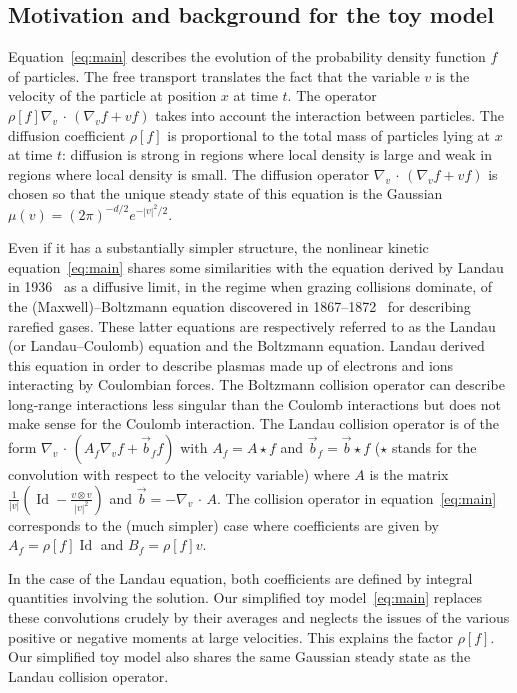 \documentclass[AHL,Unicode,longabstracts,published]{cedram}
\DeclareMathOperator{\Id}{Id}
\begin{document}
\subsection{Motivation and background for the toy model}

Equation~\eqref{eq:main} describes the evolution of the probability density function $f$ of particles. The free transport translates the fact that the variable $v$ is the velocity of the particle at position $x$ at time $t$. The operator $\rho [f] \nabla_v\,\cdot\,(\nabla_v f + vf)$ takes into account the interaction between particles. The diffusion coefficient $\rho [f]$ is proportional to the total mass of particles lying at $x$ at time $t$: diffusion is strong in regions where local density is large and weak in regions where local density is small. The diffusion operator $\nabla_v\,\cdot\,(\nabla_v f + vf)$ is chosen so that the unique steady state of this equation is the Gaussian $\mu(v) = (2\pi)^{-d/2} e^{-|v|^2/2}$.

Even if it has a substantially simpler structure, the nonlinear kinetic equation~\eqref{eq:main} shares some similarities with the equation derived by Landau in 1936~\cite{landau1936} as a diffusive limit, in the regime when grazing collisions dominate, of the (Maxwell)--Boltzmann equation discovered in 1867--1872~\cite{boltzmann1872weitere,clerk1867dynamical} for describing rarefied gases. These latter equations are respectively referred to as the Landau (or Landau--Coulomb) equation and the Boltzmann equation. Landau derived this equation in order to describe plasmas made up of electrons and ions interacting by Coulombian forces. The Boltzmann collision operator can describe long-range interactions less singular than the Coulomb interactions but does not make sense for the Coulomb interaction. The Landau collision operator is of the form $\nabla_v\,\cdot\,(A_f \nabla_vf + \vec b_f f)$ with $A_f = A \star f$ and $\vec b_f = \vec b \star f$ ($\star$ stands for the convolution with respect to the velocity variable) where $A$ is the matrix $\frac{1}{|v|} (\Id -\frac{v \otimes v}{|v|^2})$ and $\vec b= - \nabla_v\,\cdot\,A$. The collision operator in equation~\eqref{eq:main} corresponds to the (much simpler) case where coefficients are given by $A_f = \rho[f] \Id$ and $B_f = \rho[f] v$.

In the case of the Landau equation, both coefficients are defined by integral quantities involving the solution. Our simplified toy model~\eqref{eq:main} replaces these convolutions crudely by their averages and neglects the issues of the various positive or negative moments at large velocities. This explains the factor $\rho[f]$. Our simplified toy model also shares the same Gaussian steady state as the Landau collision operator.
\end{document}
